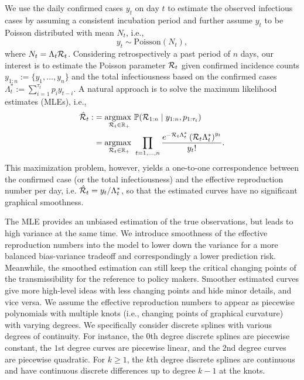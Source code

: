We use the daily confirmed cases $y_t$ on day $t$ to estimate the observed infectious cases by assuming a consistent incubation period and further assume $y_t$ to be Poisson distributed with mean $N_t$, i.e., 
\begin{equation*} 
  y_t \sim \mathrm{Poisson}(N_t),
\end{equation*}
where $N_t = \Lambda_t \mathcal{R}_t$. Considering retrospectively a past period of $n$ days, our interest is to estimate the Poisson parameter $\mathcal{R}_t$ given confirmed incidence counts ${y}_{1:n} := \{y_1,\dots,y_n\}$ and the total infectiousness based on the confirmed cases $\Lambda^{\ast}_t := \sum_{i=1}^{\tau_t} p_i y_{t-i}$. A natural approach is to solve the maximum likelihood estimates (MLEs), i.e., 
\begin{equation} \label{eq:mle}
  \begin{split}
    \hat{\mathcal{R}}_t :&= \underset{\mathcal{R}_t \in \mathbb{R}_+}{\operatorname*{argmax}\ } \mathbb{P}(\mathcal{R}_{1:n} \mid y_{1:n}, p_{1:\tau_t}) \\
    &= \underset{\mathcal{R}_t \in \mathbb{R}_+}{\operatorname*{argmax}\ } \prod_{t = 1,\dots,n} \frac{e^{- \mathcal{R}_t \Lambda^{\ast}_t} \left(\mathcal{R}_t \Lambda^{\ast}_t\right)^{y_t} }{y_t!}.
  \end{split}
\end{equation}
This maximization problem, however, yields a one-to-one correspondence between the confirmed case (or the total infectiousness) and the effective reproduction number per day, i.e. $\hat{\mathcal{R}}_t = y_t / \Lambda^{\ast}_t$, so that the estimated curves have no significant graphical smoothness. 

The MLE provides an unbiased estimation of the true observations, but leads to high variance at the same time. We introduce smoothness of the effective reproduction numbers into the model to lower down the variance for a more balanced bias-variance tradeoff and correspondingly a lower prediction risk. Meanwhile, the smoothed estimation can still keep the critical changing points of the transmissibility for the reference to policy makers. 
Smoother estimated curves give more high-level ideas with less changing points and hide minor details, and vice versa. 
We assume the effective reproduction numbers to appear as piecewise polynomials with multiple knots (i.e., changing points of graphical curvature) with varying degrees. We specifically consider discrete splines with various degrees of continuity. For instance, the $0$th degree discrete splines are piecewise constant, the $1$st degree curves are piecewise linear, and the $2$nd degree curves are piecewise quadratic. For $k\geq 1$, the $k$th degree discrete splines are continuous and have continuous discrete differences up to degree $k-1$ at the knots. 

